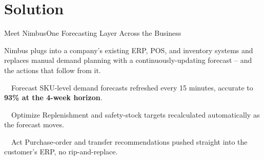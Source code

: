 \section{Solution}

\begin{frame}{Meet Nimbus}{One Forecasting Layer Across the Business}

  Nimbus plugs into a company's existing ERP, POS, and inventory systems and replaces
  manual demand planning with a continuously-updating forecast -- and the actions that
  follow from it.

  \vspace{0.45cm}

  \begin{minipage}[t]{0.31\textwidth}
    \begin{panelboxalt}{\textcolor{accentViolet}{\faChartLine}\ \ Forecast}
      \small SKU-level demand forecasts refreshed every 15 minutes, accurate to
      \textbf{93\% at the 4-week horizon}.
    \end{panelboxalt}
  \end{minipage}\hfill
  \begin{minipage}[t]{0.31\textwidth}
    \begin{panelboxalt}{\textcolor{accentViolet}{\faCogs}\ \ Optimize}
      \small Replenishment and safety-stock targets recalculated automatically as the
      forecast moves.
    \end{panelboxalt}
  \end{minipage}\hfill
  \begin{minipage}[t]{0.31\textwidth}
    \begin{panelboxalt}{\textcolor{accentViolet}{\faBell}\ \ Act}
      \small Purchase-order and transfer recommendations pushed straight into the
      customer's ERP, no rip-and-replace.
    \end{panelboxalt}
  \end{minipage}
  \par

\end{frame}

